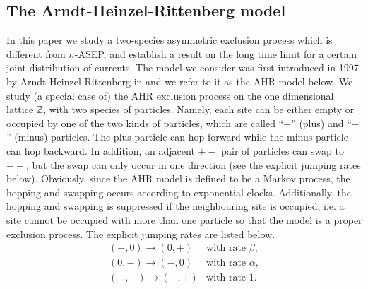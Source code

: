 \documentclass[cmp]{svjour}
\numberwithin{theorem}{section}
\numberwithin{equation}{section}
\begin{document}
\subsection{The Arndt-Heinzel-Rittenberg model}
In this paper we study a two-species asymmetric exclusion process which is different from $n$-ASEP, and establish a result on the long time limit for a certain joint distribution of currents. The model we consider was first introduced in 1997 by Arndt-Heinzel-Rittenberg in \cite{AHR-ptv}
and we refer to it as the AHR model below. We study (a special case of) the AHR exclusion process on the one dimensional lattice $\mathbb{Z}$, with two species of particles. Namely, each site can be either empty or occupied by one of the two kinds of particles, which are called ``$+$'' (plus) and ``$-$'' (minus) particles. The plus particle can hop forward while the minus particle can hop backward. In addition, an adjacent $+-$ pair of particles can swap to $-+$, but the swap can only occur in one direction (see the explicit jumping rates below). Obviously, since the AHR model is defined to be a Markov process, the hopping and swapping occurs according to exponential clocks. Additionally, the hopping and swapping is suppressed if the neighbouring site is occupied, i.e. a site cannot be occupied with more than one particle so that the model is a  proper exclusion process.
The explicit jumping rates are listed below.
\begin{equation}
\begin{array}{cc}
(+,0)\rightarrow (0,+)& \textrm{with rate } \beta,
\\[2mm]
(0,-)\rightarrow (-,0)& \textrm{with rate } \alpha,
\\[2mm]
(+,-)\rightarrow (-,+)& \textrm{with rate } 1.
\end{array}
\end {equation}
\end{document}
